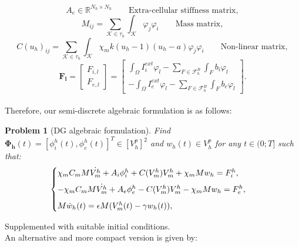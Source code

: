 \documentclass[a4paper,11pt]{article}
\newtheorem{problem}{Problem}
\begin{document}
\begin{equation*}
A_e \in \mathbb{R}^{N_h \times N_h} \qquad{\text{Extra-cellular stiffness matrix}},
\end{equation*}
\begin{equation*}
M_{ij} = \sum_{\mathcal{K} \in \tau_h}\int_{\mathcal{K}}\varphi_j\varphi_i \qquad{\text{Mass matrix}},
\end{equation*}
\begin{equation*}
C(u_h)_{ij} =  \sum_{\mathcal{K} \in \tau_h} \int_{\mathcal{K}} \chi_m k(u_h-1)(u_h-a)\varphi_j\varphi_i \qquad{\text{Non-linear matrix}},
\end{equation*}
\begin{equation*}
\bm{F_l}=\begin{bmatrix} F_{i,l} \\ F_{e,l} \end{bmatrix}=\begin{bmatrix} \int_{\Omega} I_i^{ext}\varphi_l - \sum_{F \in \mathcal{F}_h^B} \int_F b_i\varphi_l \\ - \int_{\Omega} I_e^{ext}\varphi_l - \sum_{F \in \mathcal{F}_h^B} \int_F b_e\varphi_l \end{bmatrix}.
\end{equation*}
\vspace{3mm} \\
Therefore, our semi-discrete algebraic formulation is as follows: \vspace{3mm}
\begin{problem}[DG algebraic formulation]\label{algebraic}
Find $\bm{\Phi_h}(t)=[\phi_i^h(t),\phi_e^h(t)]^T \in [V_h^p]^2$ and $w_h(t) \in V_h^p$ for any $t \in (0;T]$ such that:
\begin{equation*}
\begin{cases}
\chi_m C_m M \dot{V_m^h}+A_i \phi_i^h+C(V_m^h) V_m^h+\chi_m M w_h=F_i^h, \vspace{2mm} \\ 
-\chi_m C_m M \dot{V_m^h}+A_e \phi_e^h-C(V_m^h) V_m^h-\chi_m M w_h=F_e^h, \vspace{2mm} \\ 
M \dot{w}_h(t)=\epsilon M (V_m^h(t)-\gamma w_h(t)),
\end{cases}
\end{equation*}
\end{problem}
 \vspace{5mm}
 \noindent Supplemented with suitable initial conditions.\\
 \noindent An alternative and more compact version is given by: \vspace{3mm}
\end{document}
